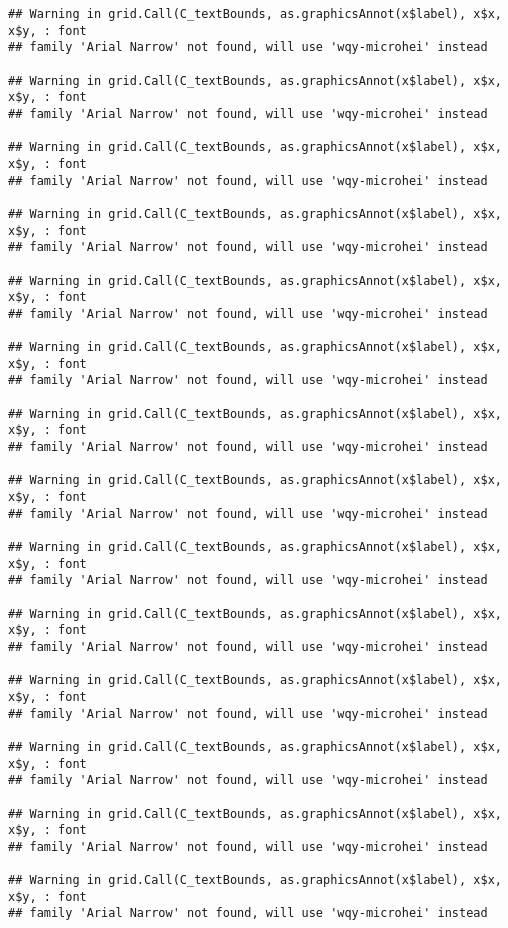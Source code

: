 \documentclass[
]{article}
\begin{document}
\begin{verbatim}
## Warning in grid.Call(C_textBounds, as.graphicsAnnot(x$label), x$x, x$y, : font
## family 'Arial Narrow' not found, will use 'wqy-microhei' instead

## Warning in grid.Call(C_textBounds, as.graphicsAnnot(x$label), x$x, x$y, : font
## family 'Arial Narrow' not found, will use 'wqy-microhei' instead

## Warning in grid.Call(C_textBounds, as.graphicsAnnot(x$label), x$x, x$y, : font
## family 'Arial Narrow' not found, will use 'wqy-microhei' instead

## Warning in grid.Call(C_textBounds, as.graphicsAnnot(x$label), x$x, x$y, : font
## family 'Arial Narrow' not found, will use 'wqy-microhei' instead

## Warning in grid.Call(C_textBounds, as.graphicsAnnot(x$label), x$x, x$y, : font
## family 'Arial Narrow' not found, will use 'wqy-microhei' instead

## Warning in grid.Call(C_textBounds, as.graphicsAnnot(x$label), x$x, x$y, : font
## family 'Arial Narrow' not found, will use 'wqy-microhei' instead

## Warning in grid.Call(C_textBounds, as.graphicsAnnot(x$label), x$x, x$y, : font
## family 'Arial Narrow' not found, will use 'wqy-microhei' instead

## Warning in grid.Call(C_textBounds, as.graphicsAnnot(x$label), x$x, x$y, : font
## family 'Arial Narrow' not found, will use 'wqy-microhei' instead

## Warning in grid.Call(C_textBounds, as.graphicsAnnot(x$label), x$x, x$y, : font
## family 'Arial Narrow' not found, will use 'wqy-microhei' instead

## Warning in grid.Call(C_textBounds, as.graphicsAnnot(x$label), x$x, x$y, : font
## family 'Arial Narrow' not found, will use 'wqy-microhei' instead

## Warning in grid.Call(C_textBounds, as.graphicsAnnot(x$label), x$x, x$y, : font
## family 'Arial Narrow' not found, will use 'wqy-microhei' instead

## Warning in grid.Call(C_textBounds, as.graphicsAnnot(x$label), x$x, x$y, : font
## family 'Arial Narrow' not found, will use 'wqy-microhei' instead

## Warning in grid.Call(C_textBounds, as.graphicsAnnot(x$label), x$x, x$y, : font
## family 'Arial Narrow' not found, will use 'wqy-microhei' instead

## Warning in grid.Call(C_textBounds, as.graphicsAnnot(x$label), x$x, x$y, : font
## family 'Arial Narrow' not found, will use 'wqy-microhei' instead


\end{verbatim}
\end{document}

